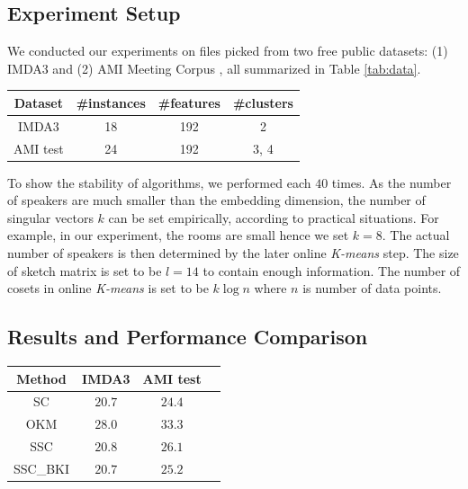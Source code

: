 \subsection{Experiment Setup}

We conducted our experiments on files picked from two free public datasets: (1) IMDA3 \cite{koh19_interspeech} and (2) AMI Meeting Corpus \cite{carletta2005ami}, all summarized in Table \ref{tab:data}.

\begin{center}
\label{tab:data}
\begin{tabular}{| c | c | c | c |}
    \hline
    Dataset & \#instances & \#features & \#clusters\\
    \hline
    IMDA3 & 18 & 192 & 2\\
    \hline
    AMI test & 24 & 192 & 3, 4\\
    \hline
\end{tabular}
\end{center}

To show the stability of algorithms, we performed each $40$ times. As the number of speakers are much smaller than the embedding dimension, the number of singular vectors $k$ can be set empirically, according to practical situations. For example, in our experiment, the rooms are small hence we set $k = 8$. The actual number of speakers is then determined by the later online \textit{K-means} step. The size of sketch matrix is set to be $l = 14$ to contain enough information. The number of cosets in online \textit{K-means} is set to be $k \log n$ where $n$ is number of data points. 

\subsection{Results and Performance Comparison}

\begin{center}
\label{tab:result}
\begin{tabular}{| c | c | c | c |}
    \hline
    Method & IMDA3 & AMI test \\
    \hline
    SC & $20.7$ & $24.4$ \\
    \hline
    OKM & $28.0$ & $33.3$ \\
    \hline
    SSC & $20.8$ & $26.1$ \\
    \hline
    SSC\_BKI & $\mathbf{20.7}$ & $\mathbf{25.2}$ \\
    \hline
\end{tabular}
\end{center}


